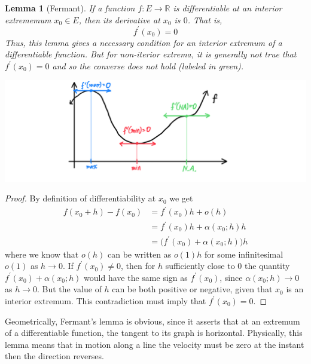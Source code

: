 \documentclass{article}
\newtheorem{lemma}[theorem]{Lemma}
\theoremstyle{remark}
\theoremstyle{definition}
\begin{document}
\begin{lemma}[Fermant]
If a function $f: E \longrightarrow \mathbb{R}$ is differentiable at an interior extrememum $x_0 \in E$, then its derivative at $x_0$ is $0$. That is, 
\[f^\prime (x_0) = 0\]
Thus, this lemma gives a necessary condition for an interior extremum of a differentiable function. But for non-iterior extrema, it is generally not true that $f^\prime(x_0) = 0$ and so the converse does not hold (labeled in green). 
\begin{center}
    \includegraphics[scale=0.3]{img/Fermant_Condition_for_Extrema.PNG}
\end{center}
\end{lemma}
\begin{proof}
By definition of differentiability at $x_0$ we get
\begin{align*}
    f(x_0 + h) - f(x_0) & = f^\prime (x_0) h + o(h) \\
    & = f^\prime(x_0) h + \alpha (x_0; h) h \\
    & = \big(f^\prime (x_0) + \alpha(x_0; h)\big) h
\end{align*}
where we know that $o(h)$ can be written as $o(1) h$ for some infinitesimal $o(1)$ as $h \rightarrow 0$. If $f^\prime (x_0) \neq 0$, then for $h$ sufficiently close to $0$ the quantity $f^\prime(x_0) + \alpha(x_0; h)$ would have the same sign as $f^\prime (x_0)$, since $\alpha(x_0; h) \rightarrow 0$ as $h \rightarrow 0$. But the value of $h$ can be both positive or negative, given that $x_0$ is an interior extremum. This contradiction must imply that $f^\prime (x_0) = 0$. 
\end{proof}

Geometrically, Fermant's lemma is obvious, since it asserts that at an extremum of a differentiable function, the tangent to its graph is horizontal. Physically, this lemma means that in motion along a line the velocity must be zero at the instant then the direction reverses. 
\end{document}
